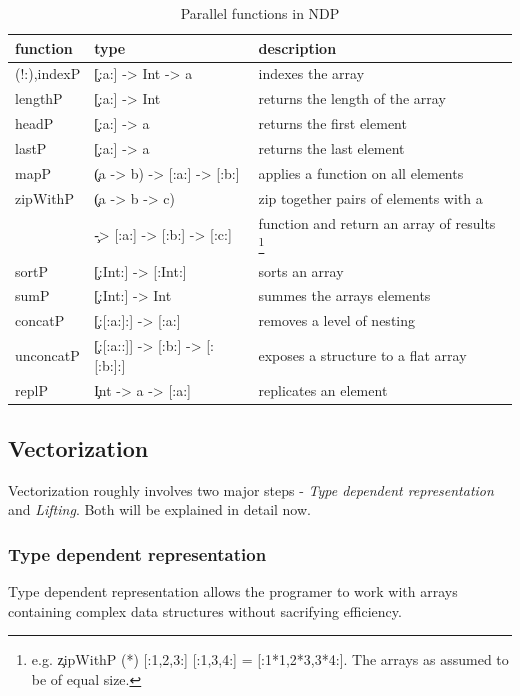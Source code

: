     \begin{table}[h]
      \caption{Parallel functions in NDP}
      \label{table:parfuns}
      \begin{tabular}{lll}
          \toprule
          function & type & description \\
          \midrule
          (!:),indexP & \c{[:a:] -> Int -> a} & indexes the array \\
          lengthP & \c{[:a:] -> Int} & returns the length of the array \\
          headP & \c{[:a:] -> a} & returns the first element\\
          lastP & \c{[:a:] -> a} & returns the last element \\
          mapP & \c{(a -> b) -> [:a:] -> [:b:]} & applies a function on all elements \\
          zipWithP & \c{(a -> b -> c)} & zip together pairs of elements with a \\
           & \c{-> [:a:] -> [:b:] -> [:c:]} & function and return an array of results
           \footnote{e.g. \c{zipWithP (*) [:1,2,3:] [:1,3,4:] = [:1*1,2*3,3*4:]}. The arrays as assumed to be of equal size.}
           \\
          sortP & \c{[:Int:] -> [:Int:]} & sorts an array \\
          sumP & \c{[:Int:] -> Int} & summes the arrays elements \\
          concatP & \c{[:[:a:]:] -> [:a:]} & removes a level of nesting \\
          unconcatP & \c{[:[:a::]] -> [:b:] -> [:[:b:]:]} & exposes a structure to a flat array \\
          replP & \c{Int -> a -> [:a:]} & replicates an element \\
      \end{tabular}
    \end{table}
    
  \subsection{Vectorization}
    Vectorization roughly involves two major steps -
    \emph{Type dependent representation} and \emph{Lifting}.
    Both will be explained in detail now.
  
    \subsubsection{Type dependent representation}
      Type dependent representation 
      allows the programer to work with arrays containing complex
      data structures without sacrifying efficiency.
      

